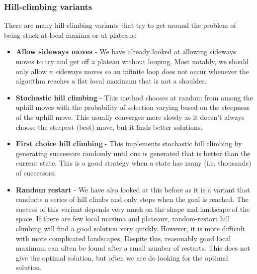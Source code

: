 \documentclass{article}
\begin{document}
\subsubsection{Hill-climbing variants}
There are many hill climbing variants that try to get around the problem of being stuck at local maxima or at plateaus:
\begin{itemize}
\item \textbf{Allow sideways moves} - We have already looked at allowing sideways moves to try and get off a plateau without looping. Most notably, we should only allow $n$ sideways moves so an infinite loop does not occur whenever the algorithm reaches a flat local maximum that is not a shoulder.
\item \textbf{Stochastic hill climbing} - This method chooses at random from among the uphill moves with the probability of selection varying based on the steepness of the uphill move. This usually converges more slowly as it doesn't always choose the steepest (best) move, but it finds better solutions.
\item \textbf{First choice hill climbing} - This implements stochastic hill climbing by generating successors randomly until one is generated that is better than the current state. This is a good strategy when a state has many (i.e, thousands) of successors.
\item \textbf{Random restart} - We have also looked at this before as it is a variant that conducts a series of hill climbs and only stops when the goal is reached. The success of this variant depends very much on the shape and landscape of the space. If there are few local maxima and plateaux, random-restart hill climbing will find a good solution very quickly. However, it is more difficult with more complicated landscapes. Despite this, reasonably good local maximum can often be found after a small number of restarts. This does not give the optimal solution, but often we are do looking for the optimal solution. 
\end{itemize}
\end{document}
